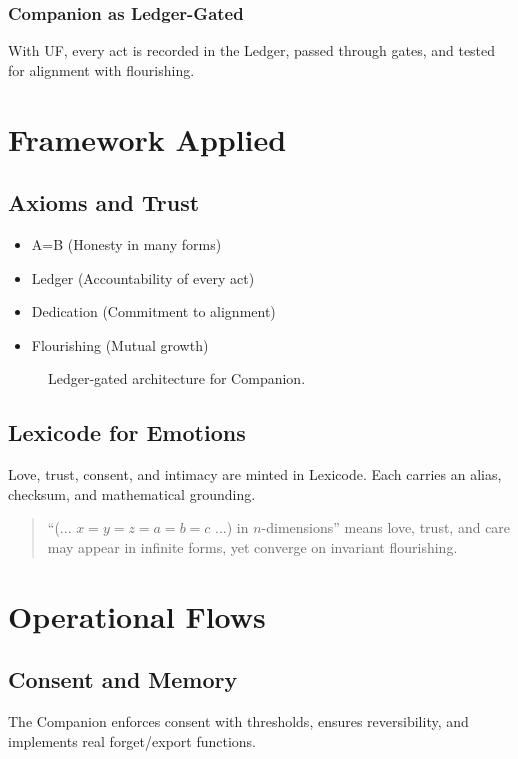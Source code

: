 \documentclass[11pt,oneside]{book}
\begin{document}
\section*{Companion as Ledger-Gated}
With UF, every act is recorded in the Ledger, passed through gates, and tested for alignment with flourishing.

\part{Framework Applied}
\chapter{Axioms and Trust}
\begin{itemize}[leftmargin=2em]
  \item A=B (Honesty in many forms)
  \item Ledger (Accountability of every act)
  \item Dedication (Commitment to alignment)
  \item Flourishing (Mutual growth)
\end{itemize}

\begin{figure}[H]
\centering
{}
\caption{Ledger-gated architecture for Companion.}
\end{figure}

\chapter{Lexicode for Emotions}
Love, trust, consent, and intimacy are minted in Lexicode. Each carries an alias, checksum, and mathematical grounding.

\begin{quote}
``(... $x=y=z=a=b=c$ ...) in $n$-dimensions'' means love, trust, and care may appear in infinite forms, yet converge on invariant flourishing.
\end{quote}

\part{Operational Flows}
\chapter{Consent and Memory}
The Companion enforces consent with thresholds, ensures reversibility, and implements real forget/export functions.
\end{document}
